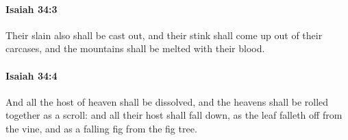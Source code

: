 		\paragraph{Isaiah 34:3} %
			\label{ISAIAH-34-3}

			Their slain also shall be cast out, and their stink shall come up out of their carcases, and the mountains shall be melted with their blood.


		\paragraph{Isaiah 34:4} %
			\label{ISAIAH-34-4}

			And all the host of heaven shall be dissolved, and the heavens shall be rolled together as a scroll: and all their host shall fall down, as the leaf falleth off from the vine, and as a falling fig from the fig tree.


